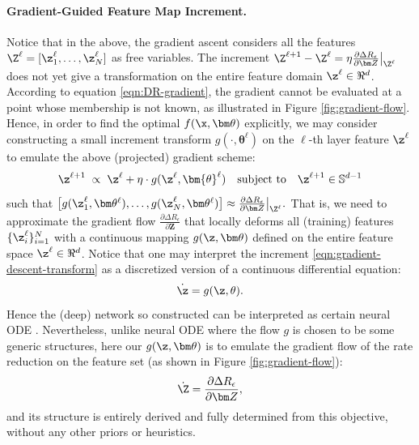 \documentclass[../../book-main.tex]{subfiles}
\begin{document}
\paragraph{Gradient-Guided Feature Map Increment.} Notice that in the above, the gradient ascent considers all the features $\Z^{\ell} = [\z^{\ell}_{1}, \dots, \z^{\ell}_{N}]$ as free variables. The increment $\Z^{\ell+1} - \Z^{\ell} = \eta \frac{\partial \Delta R_{\epsilon}}{\partial \bm Z}\big|_{\Z^\ell}$ does not yet give a transformation on the entire feature domain $\z^\ell \in \Re^d$. According to equation \eqref{eqn:DR-gradient}, the gradient cannot be evaluated at a point whose membership is not known, as illustrated in Figure \ref{fig:gradient-flow}. Hence, in order to find the optimal $f(\x,\bm  \theta)$ explicitly, we may consider constructing a small increment transform $g(\cdot, \bm{\theta}^{\ell})$ on the $\ell$-th layer feature $\z^\ell$ to emulate the above (projected) gradient scheme:
\begin{equation}
\z^{\ell + 1}   \; \propto \; \z^{\ell} + \eta\cdot  g(\z^{\ell}, \bm{\theta}^{\ell}) \quad \mbox{subject to} \quad \z^{\ell +1} \in \mathbb{S}^{d-1}
\label{eqn:gradient-descent-transform}
\end{equation}
such that $\big[g(\z_1^{\ell}, \bm \theta^{\ell}), \ldots, g(\z_N^{\ell}, \bm \theta^{\ell}) \big] \approx \frac{\partial \Delta R_{\epsilon}}{\partial \bm Z}\big|_{\Z^\ell}.$ That is, we need to approximate the gradient flow $\frac{\partial \Delta R_{\epsilon}}{\partial \bm Z}$ that locally deforms all (training) features $\{\z_i^\ell\}_{i=1}^N$ with a continuous mapping $g(\z,\bm \theta)$ defined on the entire feature space $\z^\ell \in \Re^d$.  
Notice that one may interpret the increment \eqref{eqn:gradient-descent-transform} as a discretized version of a continuous  differential equation:
\begin{equation}
\dot{\z} = g(\z, \theta).
\end{equation}
Hence the (deep) network so constructed can be interpreted as certain neural ODE \cite{chen2018neural}. Nevertheless, unlike neural ODE where the flow $g$ is chosen to be some generic structures, here our $g(\z, \bm\theta)$ is to emulate the gradient flow of the rate reduction on the feature set (as shown in Figure \ref{fig:gradient-flow}): 
\begin{equation*}
    \dot{\Z} = \frac{\partial \Delta R_{\epsilon}}{\partial \bm Z},
\end{equation*} 
and its structure is entirely derived and fully determined from this objective, without any other priors or heuristics.  
\end{document}
